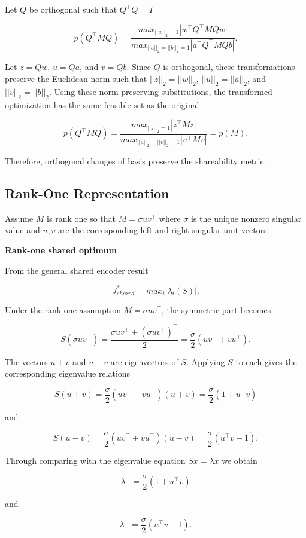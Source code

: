 \documentclass{article}
\begin{document}
Let \(Q\) be orthogonal such that \(Q^\top Q = I\)

\[
p(Q^\top M Q) = \frac{max_{||w||_2=1}|w^\top Q^\top M Q w|}{max_{||a||_2 = ||b||_2 = 1} |a^\top Q^\top M Q b|}.
\]

Let \(z = Qw\), \(u = Qa\), and \(v = Qb\). Since \(Q\) is orthogonal, these transformations preserve the Euclidean norm such that \(||z||_2 = ||w||_2\), \(||u||_2 = ||a||_2\), and \(||v||_2 = ||b||_2\). Using these norm-preserving substitutions, the transformed optimization has the same feasible set as the original

\[
p(Q^\top M Q) = \frac{max_{||z||_2=1}|z^\top M z|}{max_{||u||_2 = ||v||_2 = 1} |u^\top M v|} = p(M).
\]

Therefore, orthogonal changes of basis preserve the shareability metric.

\subsection{Rank-One Representation}

Assume \(M\) is rank one so that \(M = \sigma u v^\top\) where \(\sigma\) is the unique nonzero singular value and \(u, v\) are the corresponding left and right singular unit-vectors.

\textbf{Rank-one shared optimum}

From the general shared encoder result

\[
J_{shared}^* = max_i |\lambda_i(S)|.
\]

Under the rank one assumption \(M = \sigma u v^\top\), the symmetric part becomes

\[
S(\sigma u v^\top) = \frac{\sigma u v^\top + (\sigma u v^\top)^\top}{2} = \frac{\sigma}{2}(uv^\top + vu^\top).
\]

The vectors \(u+v\) and \(u-v\) are eigenvectors of \(S\). Applying \(S\) to each gives the corresponding eigenvalue relations

\[
S(u + v) = \frac{\sigma}{2}(uv^\top + vu^\top)(u + v) = \frac{\sigma}{2}(1 + u^\top v)
\]

and

\[
S(u - v) = \frac{\sigma}{2}(uv^\top + vu^\top)(u - v) = \frac{\sigma}{2}(u^\top v - 1).
\]

Through comparing with the eigenvalue equation \(Sx = \lambda x\) we obtain

\[
\lambda_+ = \frac{\sigma}{2}(1 + u^\top v)
\]

and

\[
\lambda_- = \frac{\sigma}{2}(u^\top v - 1).
\]
\end{document}

